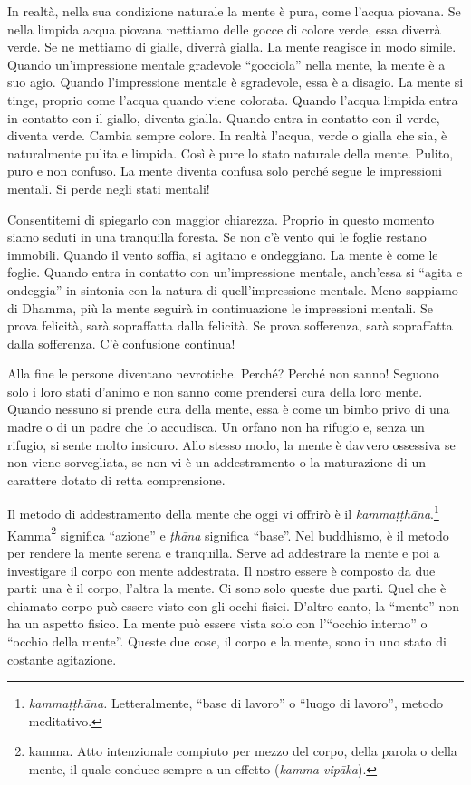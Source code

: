 In realtà, nella sua condizione naturale la mente è pura, come l'acqua
piovana. Se nella limpida acqua piovana mettiamo delle gocce di colore
verde, essa diverrà verde. Se ne mettiamo di gialle, diverrà gialla. La
mente reagisce in modo simile. Quando un'impressione mentale gradevole
``gocciola'' nella mente, la mente è a suo agio. Quando l'impressione
mentale è sgradevole, essa è a disagio. La mente si tinge, proprio come
l'acqua quando viene colorata. Quando l'acqua limpida entra in contatto
con il giallo, diventa gialla. Quando entra in contatto con il verde,
diventa verde. Cambia sempre colore. In realtà l'acqua, verde o gialla
che sia, è naturalmente pulita e limpida. Così è pure lo stato naturale
della mente. Pulito, puro e non confuso. La mente diventa confusa solo
perché segue le impressioni mentali. Si perde negli stati mentali!

Consentitemi di spiegarlo con maggior chiarezza. Proprio in questo
momento siamo seduti in una tranquilla foresta. Se non c'è vento qui le
foglie restano immobili. Quando il vento soffia, si agitano e
ondeggiano. La mente è come le foglie. Quando entra in contatto con
un'impressione mentale, anch'essa si ``agita e ondeggia'' in sintonia
con la natura di quell'impressione mentale. Meno sappiamo di Dhamma, più
la mente seguirà in continuazione le impressioni mentali. Se prova
felicità, sarà sopraffatta dalla felicità. Se prova sofferenza, sarà
sopraffatta dalla sofferenza. C'è confusione continua!

Alla fine le persone diventano nevrotiche. Perché? Perché non sanno!
Seguono solo i loro stati d'animo e non sanno come prendersi cura della
loro mente. Quando nessuno si prende cura della mente, essa è come un
bimbo privo di una madre o di un padre che lo accudisca. Un orfano non
ha rifugio e, senza un rifugio, si sente molto insicuro. Allo stesso
modo, la mente è davvero ossessiva se non viene sorvegliata, se non vi è
un addestramento o la maturazione di un carattere dotato di retta
comprensione.

Il metodo di addestramento della mente che oggi vi offrirò è il
\emph{kammaṭṭhāna}.\footnote{\emph{kammaṭṭhāna.} Letteralmente, ``base
  di lavoro'' o ``luogo di lavoro'', metodo meditativo.}
Kamma\footnote{kamma. Atto intenzionale compiuto per mezzo
  del corpo, della parola o della mente, il quale conduce sempre a un
  effetto (\emph{kamma-vipāka}).} significa ``azione'' e \emph{ṭhāna}
significa ``base''. Nel buddhismo, è il metodo per rendere la mente
serena e tranquilla. Serve ad addestrare la mente e poi a investigare il
corpo con mente addestrata. Il nostro essere è composto da due parti:
una è il corpo, l'altra la mente. Ci sono solo queste due parti. Quel
che è chiamato corpo può essere visto con gli occhi fisici. D'altro
canto, la ``mente'' non ha un aspetto fisico. La mente può essere vista
solo con l'``occhio interno'' o ``occhio della mente''. Queste due cose,
il corpo e la mente, sono in uno stato di costante agitazione.

